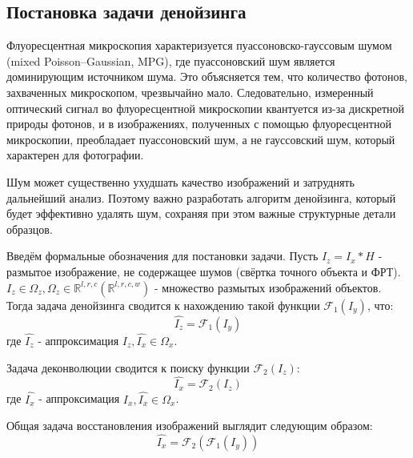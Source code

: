 \subsection{Постановка задачи денойзинга}
\par Флуоресцентная микроскопия характеризуется пуассоновско-гауссовым шумом (mixed Poisson–Gaussian, MPG), где пуассоновский шум является доминирующим источником шума. Это объясняется тем, что количество фотонов, захваченных микроскопом, чрезвычайно мало. Следовательно, измеренный оптический сигнал во флуоресцентной микроскопии квантуется из-за дискретной природы фотонов, и в изображениях, полученных с помощью флуоресцентной микроскопии, преобладает пуассоновский шум, а не гауссовский шум, который характерен для фотографии. \cite[с. 335-337]{denoising-imagej-22}
\par Шум может существенно ухудшать качество изображений и затруднять дальнейший анализ. Поэтому важно разработать алгоритм денойзинга, который будет эффективно удалять шум, сохраняя при этом важные структурные детали образцов.
\par Введём формальные обозначения для постановки задачи. Пусть $I_z = I_x * H$ - размытое изображение, не содержащее шумов (свёртка точного объекта и ФРТ). $I_z \in \Omega_z, \Omega_z \in \mathbb{R}^{l,r,c} (\mathbb{R}^{l,r,c,w})$ - множество размытых изображений объектов. Тогда задача денойзинга сводится к нахождению такой функции $\mathscr{F}_1(I_y)$, что:
\begin{equation}
	\hat{I_z} = \mathscr{F}_1(I_y)
\end{equation}
где $\hat{I_z}$ - аппроксимация $I_z, \hat{I_x} \in \Omega_x$.\\
\par Задача деконволюции сводится к поиску функции $\mathscr{F}_2(I_z)$: 
\begin{equation}
	\hat{I_x} = \mathscr{F}_2(I_z)
\end{equation}
где $\hat{I_x}$ - аппроксимация $I_x, \hat{I_x} \in \Omega_x$.\\
\par Общая задача восстановления изображений выглядит следующим образом:
\begin{equation}
	\hat{I_x} = \mathscr{F}_2(\mathscr{F}_1(I_y))
\end{equation}

